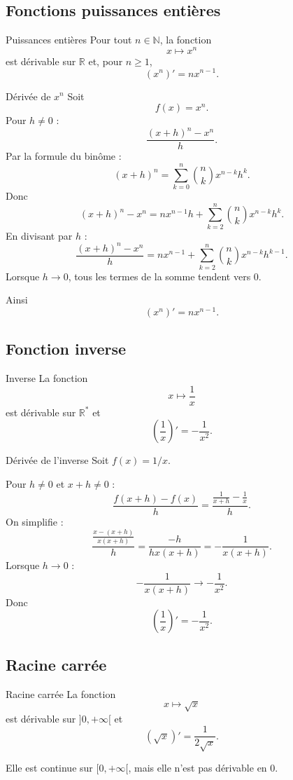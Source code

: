 \documentclass[11pt,a4paper]{article}
\newcommand{\R}{\mathbb{R}}
\newcommand{\N}{\mathbb{N}}
\begin{document}
\subsection{Fonctions puissances entières}

\begin{theorembox}{Puissances entières}
Pour tout $n\in\N$, la fonction
\[
x\mapsto x^n
\]
est dérivable sur $\R$ et, pour $n\geq1$,
\[
(x^n)'=nx^{n-1}.
\]
\end{theorembox}

\begin{proofbox}{Dérivée de $x^n$}
Soit
\[
f(x)=x^n.
\]
Pour $h\neq0$ :
\[
\frac{(x+h)^n-x^n}{h}.
\]
Par la formule du binôme :
\[
(x+h)^n=\sum_{k=0}^n \binom{n}{k}x^{n-k}h^k.
\]
Donc
\[
(x+h)^n-x^n
=
nx^{n-1}h+\sum_{k=2}^n \binom{n}{k}x^{n-k}h^k.
\]
En divisant par $h$ :
\[
\frac{(x+h)^n-x^n}{h}
=
nx^{n-1}
+
\sum_{k=2}^n \binom{n}{k}x^{n-k}h^{k-1}.
\]
Lorsque $h\to0$, tous les termes de la somme tendent vers $0$.

Ainsi
\[
(x^n)'=nx^{n-1}.
\]
\end{proofbox}

\subsection{Fonction inverse}

\begin{theorembox}{Inverse}
La fonction
\[
x\mapsto \frac1x
\]
est dérivable sur $\R^\ast$ et
\[
\left(\frac1x\right)'=-\frac1{x^2}.
\]
\end{theorembox}

\begin{proofbox}{Dérivée de l'inverse}
Soit $f(x)=1/x$.

Pour $h\neq0$ et $x+h\neq0$ :
\[
\frac{f(x+h)-f(x)}{h}
=
\frac{\frac1{x+h}-\frac1x}{h}.
\]
On simplifie :
\[
\frac{\frac{x-(x+h)}{x(x+h)}}{h}
=
\frac{-h}{h x(x+h)}
=
-\frac1{x(x+h)}.
\]
Lorsque $h\to0$ :
\[
-\frac1{x(x+h)}\to -\frac1{x^2}.
\]
Donc
\[
\left(\frac1x\right)'=-\frac1{x^2}.
\]
\end{proofbox}

\subsection{Racine carrée}

\begin{theorembox}{Racine carrée}
La fonction
\[
x\mapsto \sqrt{x}
\]
est dérivable sur $]0,+\infty[$ et
\[
(\sqrt{x})'=\frac1{2\sqrt{x}}.
\]

Elle est continue sur $[0,+\infty[$, mais elle n'est pas dérivable en $0$.
\end{theorembox}
\end{document}

